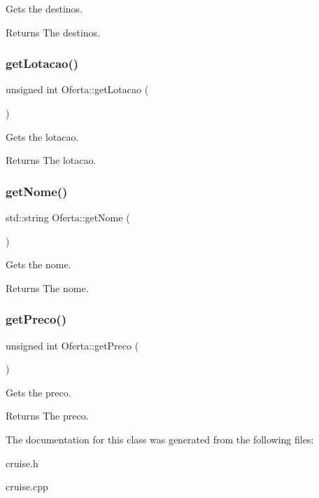 Gets the destinos. 

\begin{DoxyReturn}{Returns}
The destinos. 
\end{DoxyReturn}
\mbox{\label{classOferta_a9c8fbec401e54e590828209931bf25b0}} 
\subsubsection{\texorpdfstring{get\+Lotacao()}{getLotacao()}}
{\footnotesize\ttfamily unsigned int Oferta\+::get\+Lotacao (\begin{DoxyParamCaption}{ }\end{DoxyParamCaption})\hspace{0.3cm}{\ttfamily [inline]}}



Gets the lotacao. 

\begin{DoxyReturn}{Returns}
The lotacao. 
\end{DoxyReturn}
\mbox{\label{classOferta_a16da38d9f369b000cb544c34200707b8}} 
\subsubsection{\texorpdfstring{get\+Nome()}{getNome()}}
{\footnotesize\ttfamily std\+::string Oferta\+::get\+Nome (\begin{DoxyParamCaption}{ }\end{DoxyParamCaption})\hspace{0.3cm}{\ttfamily [inline]}}



Gets the nome. 

\begin{DoxyReturn}{Returns}
The nome. 
\end{DoxyReturn}
\mbox{\label{classOferta_a6237afc2e8a33fb55b1ef0decf9d9aaa}} 
\subsubsection{\texorpdfstring{get\+Preco()}{getPreco()}}
{\footnotesize\ttfamily unsigned int Oferta\+::get\+Preco (\begin{DoxyParamCaption}{ }\end{DoxyParamCaption})\hspace{0.3cm}{\ttfamily [inline]}}



Gets the preco. 

\begin{DoxyReturn}{Returns}
The preco. 
\end{DoxyReturn}


The documentation for this class was generated from the following files\+:\begin{DoxyCompactItemize}
\item 
cruise.\+h\item 
cruise.\+cpp\end{DoxyCompactItemize}
